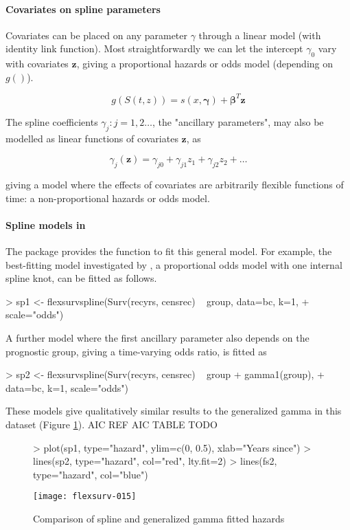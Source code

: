 \documentclass[nojss,nofooter]{jss}
\begin{document}
\paragraph{Covariates on spline parameters}
Covariates can be placed on any parameter $\gamma$ through a linear
model (with identity link function).  Most straightforwardly we can
let the intercept $\gamma_0$ vary with covariates $\mathbf{z}$, giving
a proportional hazards or odds model (depending on $g()$).

\[g(S(t,z)) = s(x, \bm{\gamma}) + \bm{\beta}^T \mathbf{z} \]


The spline coefficients $\gamma_j: j=1, 2 \ldots$, the "ancillary parameters",
may also be modelled as linear functions of covariates $\mathbf{z}$, as

\[\gamma_j(\mathbf{z}) = \gamma_{j0} + \gamma_{j1}z_1 + \gamma_{j2}z_2 + \ldots\]

giving a model where the effects of covariates are arbitrarily flexible
functions of time: a non-proportional hazards or odds model.

\paragraph{Spline models in }

The package provides the function  to fit this general 
model. 
For example, the best-fitting model investigated by \citet{royston:parmar},
a proportional odds model with one internal spline knot, can be fitted 
as follows.
\begin{Schunk}
\begin{Sinput}
> sp1 <- flexsurvspline(Surv(recyrs, censrec) ~ group, data=bc, k=1, 
+                       scale="odds")
\end{Sinput}
\end{Schunk}
A further model where the first ancillary parameter also depends on the prognostic
group, giving a time-varying odds ratio, is fitted as
\begin{Schunk}
\begin{Sinput}
> sp2 <- flexsurvspline(Surv(recyrs, censrec) ~ group + gamma1(group),
+                       data=bc, k=1, scale="odds")
\end{Sinput}
\end{Schunk}
These models give qualitatively similar results to the generalized gamma
in this dataset (Figure \ref{fig:spline:haz}).   AIC REF AIC TABLE TODO
\begin{figure}[h]
  \centering
\begin{Schunk}
\begin{Sinput}
> plot(sp1, type="hazard", ylim=c(0, 0.5), xlab="Years since")
> lines(sp2, type="hazard", col="red", lty.fit=2)
> lines(fs2, type="hazard", col="blue")
\end{Sinput}
\end{Schunk}
\texttt{[image: flexsurv-015]}
  \caption{Comparison of spline and generalized gamma fitted hazards}
  \label{fig:spline:haz}
\end{figure}
\end{document}
